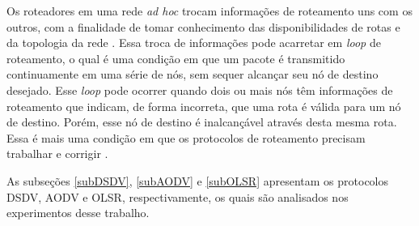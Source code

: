Os roteadores em uma rede \textit{ad hoc} trocam informa\c{c}\~oes de roteamento uns com os outros, com a finalidade de tomar conhecimento das disponibilidades de rotas e da topologia da rede \cite{pereira}. 
Essa troca de informa\c{c}\~oes pode acarretar em \textit{loop} de roteamento, o qual \'e uma condi\c{c}\~ao em que um pacote \'e transmitido continuamente em uma s\'erie de n\'os, sem sequer alcan\c{c}ar seu n\'o de destino desejado. 
Esse \textit{loop} pode ocorrer quando dois ou mais n\'os t\^em informa\c{c}\~oes de roteamento que indicam, de forma incorreta, que uma rota \'e v\'alida para um n\'o de destino. Por\'em, esse n\'o de destino \'e inalcan\c{c}\'avel atrav\'es desta mesma rota. 
Essa \'e mais uma condi\c{c}\~ao em que os protocolos de roteamento precisam trabalhar e corrigir \cite{hengartnet}.

As subse\c{c}\~oes \ref{subDSDV}, \ref{subAODV} e \ref{subOLSR} apresentam os protocolos DSDV, AODV e OLSR, respectivamente, os quais s\~ao analisados nos experimentos desse trabalho.

